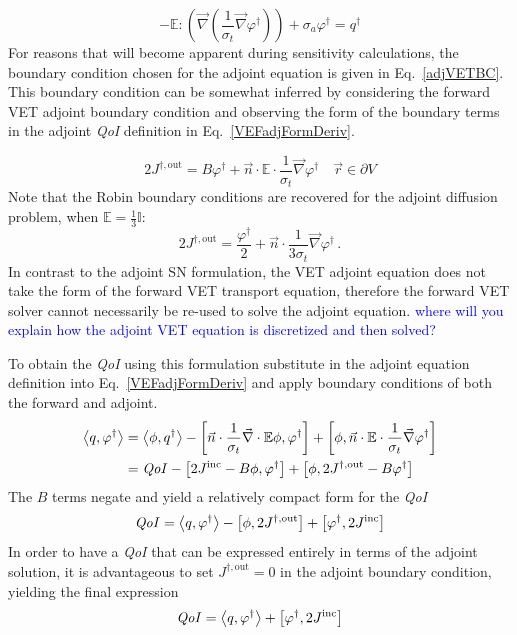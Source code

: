 \documentclass[12pt]{report}
\newcommand{\vr}{\vec{r}}
\newcommand{\bra}{\left\langle}
\newcommand{\ket}{\right\rangle}
\newcommand{\sbra}{\left[}
\newcommand{\sket}{\right]}
\renewcommand{\div}{\vec{\nabla} \cdot}
\newcommand{\grad}{\vec{\nabla}}
\newcommand{\vefadj}{\varphi^\dag}
\newcommand{\bound}{\partial V}
\newcommand{\vn}{\vec{n}}
\newcommand{\Edd}{\mathbb{E}}
\newcommand{\sigt}{\sigma_t}
\newcommand{\siga}{\sigma_a}
\newcommand{\scalSource}{q}
\newcommand{\scalResp}{q^\dag}
\newcommand{\qoi}{{\it QoI}\xspace}
\newcommand{\comment}[2]{\marginpar{\textcolor{#2}{$\star$}}\textcolor{#2}{#1}\newline}
\newcommand{\jcr}[1]{\comment{#1}{blue}}
\newcommand{\jcr}[1]{\phantom{a}}
\begin{document}
\begin{equation}
\label{adjForm}
- \Edd : \left( \grad \left( \frac{1}{\sigt}\grad \vefadj \right) \right) + \siga \vefadj = \scalResp
\end{equation}
For reasons that will become apparent during sensitivity calculations, the boundary condition chosen for the adjoint equation is given in Eq.~\eqref{adjVETBC}. This boundary condition can be somewhat inferred by considering the forward VET adjoint boundary condition and observing the form of the boundary terms in the adjoint \qoi definition in Eq.~\eqref{VEFadjFormDeriv}.

\begin{equation}
\label{adjVETBC}
2J^{\dag,\text{out}} = B \vefadj+ \vn \cdot
\Edd \cdot \frac{1}{\sigma_{t} } \vec{\nabla} \vefadj    \quad \vr \in \bound
\end{equation}
Note that the Robin boundary conditions are recovered for the adjoint diffusion problem, when $\Edd = \tfrac{1}{3} \mathbb{I}$:
\[
2 J^{\dag,\text{out}} = \frac{\vefadj}{2} +\vn \cdot \frac{1}{3\sigt} \grad \vefadj \,.
\]
In contrast to the adjoint SN formulation, the VET adjoint equation does not take the form of the  
forward VET transport equation, therefore the forward VET solver 
cannot necessarily be re-used to solve the adjoint equation. 
\jcr{where will you explain how the adjoint VET equation is discretized and then solved?}

To obtain the \qoi using this formulation substitute in the adjoint equation definition 
into Eq.~\eqref{VEFadjFormDeriv} and apply boundary conditions of both the forward and adjoint.
\begin{equation}
\label{VETQoIAdjUnpDeriv}
\begin{split}
 \bra \scalSource , \vefadj \ket 
&=   \bra \phi, \scalResp \ket - \sbra \vn \cdot \frac{1}{\sigt}\div \Edd \phi, \vefadj \sket + \sbra \phi, \vn \cdot \Edd \cdot \frac{1}{\sigt} \grad \vefadj \sket \\
&=   \qoi - \sbra 2J^{\text{inc}} - B \phi, \vefadj \sket + \sbra \phi, 2J^{\dag,\text{out}} - B \vefadj \sket \\
\end{split}
\end{equation}
The $B$ terms negate and yield a relatively compact form for the \qoi
\begin{equation}
\label{VETQoIAdj}
\qoi=\bra \scalSource , \vefadj \ket 
- \sbra \phi, 2J^{\dag,\text{out}} \sket  + \sbra \varphi^\dag, 2J^{\text{inc}} \sket
\end{equation}
In order to have a \qoi that can be expressed entirely in terms of the adjoint solution, it is advantageous to 
set $J^{\dag,\text{out}}=0$ in the adjoint boundary condition, yielding the final expression
\begin{equation}
\qoi=\bra \scalSource , \vefadj \ket  + \sbra \vefadj, 2J^{\text{inc}} \sket
\end{equation}
\end{document}
